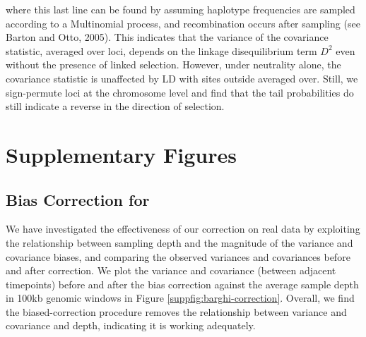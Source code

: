 \documentclass[11pt]{article}
\begin{document}
{where this last line can be found by assuming haplotype frequencies are sampled
according to a Multinomial process, and recombination occurs after sampling
(see Barton and Otto, 2005). This indicates that the variance of the covariance
statistic, averaged over loci, depends on the linkage disequilibrium term $D^2$
even without the presence of linked selection. However, under neutrality alone,
the covariance statistic is unaffected by LD with sites outside averaged over.
Still, we sign-permute loci at the chromosome level and find that the tail
probabilities do still indicate a reverse in the direction of selection. }

\clearpage
\section{Supplementary Figures}


\subsection{Bias Correction for \textcite{Barghi2019-qy}}

We have investigated the effectiveness of our correction on real data by
exploiting the relationship between sampling depth and the magnitude of the
variance and covariance biases, and comparing the observed variances and
covariances before and after correction. We plot the variance and covariance
(between adjacent timepoints) before and after the bias correction against the
average sample depth in 100kb genomic windows in Figure
\ref{suppfig:barghi-correction}. Overall, we find the biased-correction
procedure removes the relationship between variance and covariance and depth, indicating it is working adequately.
\end{document}
